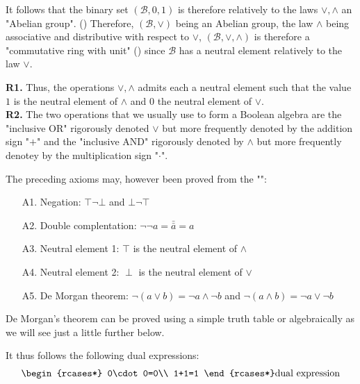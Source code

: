 	It follows that the binary set $(\mathcal{B},0,1)$ is therefore relatively to the laws $\vee,\wedge$ an "Abelian group". () Therefore, $(\mathcal{B},\vee)$ being an Abelian group, the law  $\wedge$  being associative and distributive with respect to $\vee$, $(\mathcal{B},\vee,\wedge)$ is therefore a "commutative ring with unit" () since $\mathcal{B}$ has a neutral element relatively to the law $\vee$.
	\begin{tcolorbox}[title=Remarks,colframe=black,arc=10pt]
	\textbf{R1.} Thus, the operations $\vee,\wedge$ admits each a neutral element such that the value $1$ is the neutral element of $\wedge$ and $0$ the neutral element of $\vee$.\\
	
	\textbf{R2.} The two operations that we usually use to form a Boolean algebra are the "inclusive OR" rigorously denoted $\vee$ but more frequently denoted by the addition sign "$+$" and the "inclusive AND" rigorously denoted by $\wedge$ but more frequently denotey by the multiplication sign "$\cdot$".
	\end{tcolorbox}
	
	The preceding axioms may, however been proved from the "":
	\begin{enumerate}
		\item[A1.] Negation: $\top\neg\bot$ and $\bot\neg \top$
		
		\item[A2.] Double complentation: $\neg\neg a=\bar{\bar{a}}=a$
		
		\item[A3.] Neutral element 1: $\top$ is the neutral element of $\wedge$
		\item[A4.] Neutral element 2: $\perp$ is the neutral element of $\vee$
		
		\item[A5.] De Morgan theorem: $\neg (a \vee b)=\neg a \wedge \neg b$ and $\neg (a\wedge b)=\neg a \vee \neg b$
	\end{enumerate}
	\begin{tcolorbox}[title=Remark,colframe=black,arc=10pt]
	De Morgan's theorem can be proved using a simple truth table or algebraically as we will see just a little further below.
	\end{tcolorbox}
	It thus follows the following dual expressions:
	\begin{gather*}
	\begin{rcases*}
	0\cdot 0=0\\
	1+1=1
	\end{rcases*} \text{dual expression}
	\end{gather*}
	
